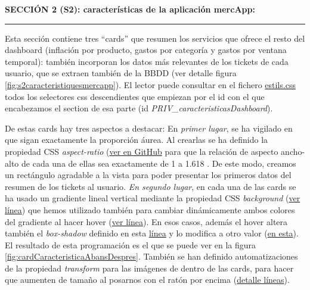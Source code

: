 \documentclass[a4paper,12pt]{report}
\begin{document}
	
	
	
	\noindent \textbf{SECCIÓN 2 (S2): características de la aplicación mercApp:}
	\hrule
	\vspace{.5em}
	
	Esta sección contiene tres ``cards'' que resumen los servicios que ofrece el resto del dashboard (inflación por producto, gastos por categoría y gastos por ventana temporal): también incorporan los datos más relevantes de los tickets de cada usuario, que se extraen también de la BBDD (ver detalle figura \ref{fig:s2caracteristiquesmercapp}). El lector puede consultar en el fichero \href{https://github.com/blackcub3s/mercApp/blob/main/APP%20WEB/__frontend__produccio__/app/css/dashboard/estils.css}{estils.css} todos los selectores css descendientes que empiezan por el id con el que encabezamos el section de esa parte (id \textit{PRIV\_caracteristicasDashboard}).

	
	De estas cards hay tres aspectos a destacar: En \textit{primer lugar}, se ha vigilado en que sigan exactamente la proporción áurea. Al crearlas se ha definido la propiedad CSS \textit{aspect-ratio} (\href{https://github.com/blackcub3s/mercApp/blob/663360ea63eafd38c1fa052e7a994e22d7f0a5f6/APP%20WEB/__frontend__produccio__/app/css/dashboard/estils.css#L80}{ver en GitHub} para que la relación de aspecto ancho-alto de cada una de ellas sea exactamente de 1 a 1.618 \cite{wikiPropAurea}. De este modo, creamos un rectángulo agradable a la vista para poder presentar los primeros datos del resumen de los tickets al usuario. \textit{En segundo lugar}, en cada una de las cards se ha usado un gradiente lineal vertical mediante la propiedad CSS \textit{background} (\href{https://github.com/blackcub3s/mercApp/blob/663360ea63eafd38c1fa052e7a994e22d7f0a5f6/APP%20WEB/__frontend__produccio__/app/css/dashboard/estils.css#L85}{ver línea}) que hemos utilizado también para cambiar dinámicamente ambos colores del gradiente al hacer hover (\href{https://github.com/blackcub3s/mercApp/blob/663360ea63eafd38c1fa052e7a994e22d7f0a5f6/APP%20WEB/__frontend__produccio__/app/css/dashboard/estils.css#L126}{ver línea}). En esos casos, además el hover altera también el \textit{box-shadow} definido en esta \href{https://github.com/blackcub3s/mercApp/blob/663360ea63eafd38c1fa052e7a994e22d7f0a5f6/APP%20WEB/__frontend__produccio__/app/css/dashboard/estils.css#L84}{línea} y lo modifica a otro valor (\href{https://github.com/blackcub3s/mercApp/blob/663360ea63eafd38c1fa052e7a994e22d7f0a5f6/APP%20WEB/__frontend__produccio__/app/css/dashboard/estils.css#L125}{en esta}). El resultado de esta programación es el que se puede ver en la figura \ref{fig:cardCaracteristicaAbansDespres}. También se han definido automatizaciones de la propiedad \textit{transform} para las imágenes de dentro de las cards, para hacer que aumenten de tamaño al posarnos con el ratón por encima (\href{https://github.com/blackcub3s/mercApp/blob/663360ea63eafd38c1fa052e7a994e22d7f0a5f6/APP%20WEB/__frontend__produccio__/app/css/dashboard/estils.css#L106-L108}{detalle líneas}).
	
\end{document}
